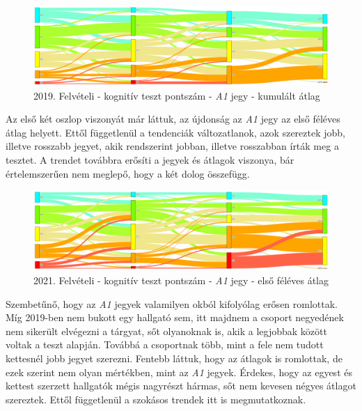 \documentclass[12pt]{article}
\begin{document}
\begin{figure}[H]
\centering
\includegraphics[scale=0.5]{kepek/2019_felvi_teszt_a1_kumatl.png}
\caption{2019. Felvételi - kognitív teszt pontszám - \textit{A1} jegy - kumulált átlag}
\label{fig:2019_felvi_teszt_a1_kumatl}
\end{figure}

Az első két oszlop viszonyát már láttuk, az újdonság az \textit{A1} jegy az első féléves átlag helyett. Ettől függetlenül a tendenciák változatlanok, azok szereztek jobb, illetve rosszabb jegyet, akik rendszerint jobban, illetve rosszabban írták meg a tesztet. A trendet továbbra erősíti a jegyek és átlagok viszonya, bár értelemszerűen nem meglepő, hogy a két dolog összefügg.

\begin{figure}[H]
\centering
\includegraphics[scale=0.5]{kepek/2021_felvi_teszt_a1_atlag.png}
\caption{2021. Felvételi - kognitív teszt pontszám - \textit{A1} jegy - első féléves átlag}
\label{fig:2021_felvi_teszt_a1_atlag}
\end{figure}

Szembetűnő, hogy az \textit{A1} jegyek valamilyen okból kifolyólag erősen romlottak. Míg 2019-ben nem bukott egy hallgató sem, itt majdnem a csoport negyedének nem sikerült elvégezni a tárgyat, sőt olyanoknak is, akik a legjobbak között voltak a teszt alapján. Továbbá a csoportnak több, mint a fele nem tudott kettesnél jobb jegyet szerezni. Fentebb láttuk, hogy az átlagok is romlottak, de ezek szerint nem olyan mértékben, mint az \textit{A1} jegyek. Érdekes, hogy az egyest és kettest szerzett hallgatók mégis nagyrészt hármas, sőt nem kevesen négyes átlagot szereztek. Ettől függetlenül a szokásos trendek itt is megmutatkoznak.
 
\end{document}
